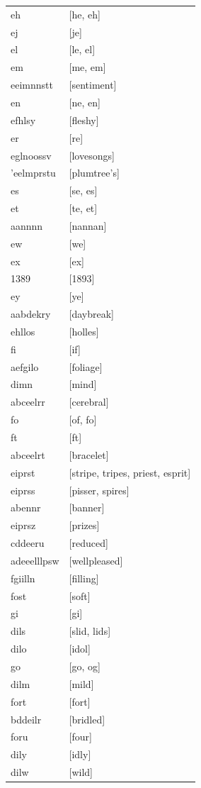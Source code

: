 \documentclass{article}
\begin{document}
\begin{tabular}{ll}
eh & [he, eh] \\
ej & [je] \\
el & [le, el] \\
em & [me, em] \\
eeimnnstt & [sentiment] \\
en & [ne, en] \\
efhlsy & [fleshy] \\
er & [re] \\
eglnoossv & [lovesongs] \\
'eelmprstu & [plumtree's] \\
es & [se, es] \\
et & [te, et] \\
aannnn & [nannan] \\
ew & [we] \\
ex & [ex] \\
1389 & [1893] \\
ey & [ye] \\
aabdekry & [daybreak] \\
ehllos & [holles] \\
fi & [if] \\
aefgilo & [foliage] \\
dimn & [mind] \\
abceelrr & [cerebral] \\
fo & [of, fo] \\
ft & [ft] \\
abceelrt & [bracelet] \\
eiprst & [stripe, tripes, priest, esprit] \\
eiprss & [pisser, spires] \\
abennr & [banner] \\
eiprsz & [prizes] \\
cddeeru & [reduced] \\
adeeelllpsw & [wellpleased] \\
fgiilln & [filling] \\
fost & [soft] \\
gi & [gi] \\
dils & [slid, lids] \\
dilo & [idol] \\
go & [go, og] \\
dilm & [mild] \\
fort & [fort] \\
bddeilr & [bridled] \\
foru & [four] \\
dily & [idly] \\
dilw & [wild] \\

\end{tabular}
\end{document}
